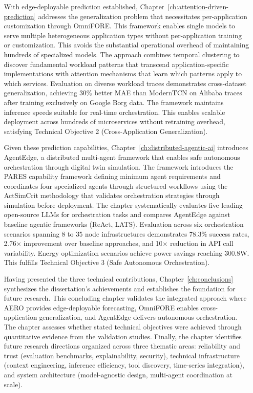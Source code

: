 With edge-deployable prediction established, Chapter~\ref{ch:attention-driven-prediction} addresses the generalization problem that necessitates per-application customization through \ac{OmniFORE}. This framework enables single models to serve multiple heterogeneous application types without per-application training or customization. This avoids the substantial operational overhead of maintaining hundreds of specialized models. The approach combines temporal clustering to discover fundamental workload patterns that transcend application-specific implementations with attention mechanisms that learn which patterns apply to which services. Evaluation on diverse workload traces demonstrates cross-dataset generalization, achieving 30\% better \ac{MAE} than \ac{ModernTCN} on Alibaba traces after training exclusively on Google Borg data. The framework maintains inference speeds suitable for real-time orchestration. This enables scalable deployment across hundreds of microservices without retraining overhead, satisfying Technical Objective 2 (Cross-Application Generalization).

Given these prediction capabilities, Chapter~\ref{ch:distributed-agentic-ai} introduces \ac{AgentEdge}, a distributed multi-agent framework that enables safe autonomous orchestration through digital twin simulation. The framework introduces the \ac{PARES} capability framework defining minimum agent requirements and coordinates four specialized agents through structured workflows using the \ac{ActSimCrit} methodology that validates orchestration strategies through simulation before deployment. The chapter systematically evaluates five leading open-source \acp{LLM} for orchestration tasks and compares \ac{AgentEdge} against baseline agentic frameworks (\ac{ReAct}, \ac{LATS}). Evaluation across six orchestration scenarios spanning 8 to 35 node infrastructures demonstrates 78.3\% success rates, 2.76× improvement over baseline approaches, and 10× reduction in \ac{API} call variability. Energy optimization scenarios achieve power savings reaching 300.8W. This fulfills Technical Objective 3 (Safe Autonomous Orchestration).

Having presented the three technical contributions, Chapter~\ref{ch:conclusions} synthesizes the dissertation's achievements and establishes the foundation for future research. This concluding chapter validates the integrated approach where \ac{AERO} provides edge-deployable forecasting, \ac{OmniFORE} enables cross-application generalization, and \ac{AgentEdge} delivers autonomous orchestration. The chapter assesses whether stated technical objectives were achieved through quantitative evidence from the validation studies. Finally, the chapter identifies future research directions organized across three thematic areas: reliability and trust (evaluation benchmarks, explainability, security), technical infrastructure (context engineering, inference efficiency, tool discovery, time-series integration), and system architecture (model-agnostic design, multi-agent coordination at scale).
